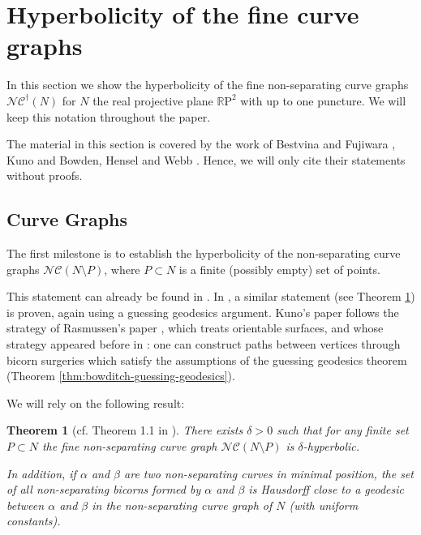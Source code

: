 \documentclass[10pt,a4paper]{amsart}
\newtheorem{theorem}{Theorem}[section]
\newcommand{\rp}{\mathbb{R}\mathrm{P}^2}
\newcommand{\ncg}{\mathcal{NC}}
\newcommand{\fncg}{\mathcal{NC}^\dagger}
\begin{document}
\section{Hyperbolicity of the fine curve graphs}
In this section we show the hyperbolicity of the fine non-separating curve graphs $\fncg(N)$ for $N$ the real projective plane $\rp$ with up to one puncture.
We will keep this notation throughout the paper.

The material in this section is covered by the work of Bestvina and Fujiwara \cite{Bestvina-refinement}, Kuno \cite{kuno-hyperbolicity} and Bowden, Hensel and Webb \cite{BHW1}.
Hence, we will only cite their statements without proofs.

\subsection{Curve Graphs}\label{subsec:kuno-argument}

The first milestone is to establish the hyperbolicity of the non-separating curve graphs $\ncg(N\setminus P)$, where $P \subset N$ is a finite (possibly empty) set of points.

This statement can already be found in \cite{Bestvina-refinement}.
In \cite{kuno-hyperbolicity}, a similar statement (see Theorem \ref{thm:unif-hyperbolicity}) is proven, again using a guessing geodesics argument.
Kuno's paper follows the strategy of Rasmussen's paper \cite{rasmussen}, which treats orientable surfaces, and whose strategy appeared before in \cite{unicorns}:
one can construct paths between vertices through bicorn surgeries which satisfy the assumptions of the guessing geodesics theorem (Theorem \ref{thm:bowditch-guessing-geodesics}).

We will rely on the following result:
\begin{theorem}[cf. Theorem 1.1 in \cite{kuno-hyperbolicity}]\label{thm:unif-hyperbolicity}
    There exists $\delta > 0$ such that for any finite set $P\subset N$ the fine non-separating curve graph $\ncg(N\setminus P)$ is $\delta$-hyperbolic.

    In addition, if $\alpha$ and $\beta$ are two non-separating curves in minimal position, the set of all non-separating bicorns formed by $\alpha$ and $\beta$ is Hausdorff close to a geodesic between $\alpha$ and $\beta$ in the non-separating curve graph of $N$ (with uniform constants).
\end{theorem}
\end{document}
